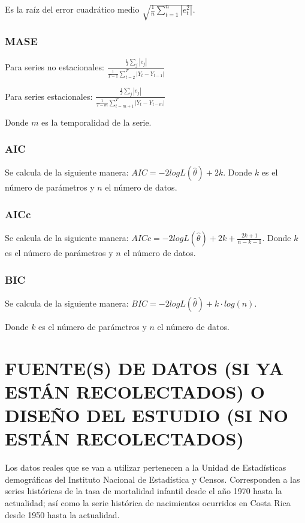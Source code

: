\documentclass[]{article}
\begin{document}
Es la raíz del error cuadrático medio
\(\sqrt{\frac{1}{n}\sum_{t=1}^n |e_t^2|}\).

\subsubsection{MASE}

Para series no estacionales:
\(\frac{\frac{1}{J}\sum_j|e_j|}{\frac{1}{T-1}\sum_{t=2}^T|Y_t-Y_{t-1}|}\)

Para series estacionales:
\(\frac{\frac{1}{J}\sum_j|e_j|}{\frac{1}{T-m}\sum_{t=m+1}^T|Y_t-Y_{t-m}|}\)

Donde \(m\) es la temporalidad de la serie.

\subsubsection{AIC}

Se calcula de la siguiente manera:
\(AIC=-2logL\left(\hat\theta\right)+2k\). Donde \(k\) es el número de
parámetros y \(n\) el número de datos.

\subsubsection{AICc}

Se calcula de la siguiente manera:
\(AICc=-2logL\left(\hat\theta\right)+2k+\frac{2k+1}{n-k-1}\). Donde
\(k\) es el número de parámetros y \(n\) el número de datos.

\subsubsection{BIC}

Se calcula de la siguiente manera:
\(BIC=-2logL\left(\hat\theta\right)+k\cdot log(n)\).

Donde \(k\) es el número de parámetros y \(n\) el número de datos.

\section{FUENTE(S) DE DATOS (SI YA ESTÁN RECOLECTADOS) O DISEÑO DEL ESTUDIO (SI NO ESTÁN RECOLECTADOS)}

Los datos reales que se van a utilizar pertenecen a la Unidad de
Estadísticas demográficas del Instituto Nacional de Estadística y
Censos. Corresponden a las series históricas de la tasa de mortalidad
infantil desde el año 1970 hasta la actualidad; así como la serie
histórica de nacimientos ocurridos en Costa Rica desde 1950 hasta la
actualidad.
\end{document}
